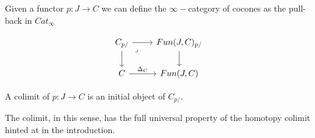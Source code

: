 Given a functor $p:J\rightarrow C$ we can define the $\infty-$category of cocones as the pull-back in $Cat_\infty$

\[\begin{tikzcd}
	{C_{p/}} & {Fun(J,C)_{p/}} \\
	C & {Fun(J,C)}
	\arrow[from=1-1, to=1-2]
	\arrow[from=1-1, to=2-1]
	\arrow["\lrcorner"{anchor=center, pos=0.125}, draw=none, from=1-1, to=2-2]
	\arrow[from=1-2, to=2-2]
	\arrow["{\Delta_C}", from=2-1, to=2-2]
\end{tikzcd}\]

\begin{definition}
    A colimit of $p:J\rightarrow C$ is an initial object of $C_{p/}$.
\end{definition}

The colimit, in this sense, has the full universal property of the homotopy colimit hinted at in the introduction.